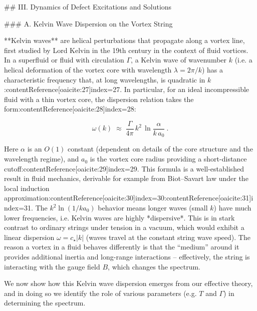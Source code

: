 \documentclass[12pt]{article}
\begin{document}
## III. Dynamics of Defect Excitations and Solutions

### A. Kelvin Wave Dispersion on the Vortex String 

**Kelvin waves** are helical perturbations that propagate along a vortex line, first studied by Lord Kelvin in the 19th century in the context of fluid vortices. In a superfluid or fluid with circulation $\Gamma$, a Kelvin wave of wavenumber $k$ (i.e. a helical deformation of the vortex core with wavelength $\lambda = 2\pi/k$) has a characteristic frequency that, at long wavelengths, is quadratic in $k$:contentReference[oaicite:27]{index=27}. In particular, for an ideal incompressible fluid with a thin vortex core, the dispersion relation takes the form:contentReference[oaicite:28]{index=28}:

\[ \omega(k) \;\approx\; \frac{\Gamma}{4\pi} \, k^2 \,\ln\!\frac{\alpha}{k\,a_0}~. \tag{8}\] 

Here $\alpha$ is an $O(1)$ constant (dependent on details of the core structure and the wavelength regime), and $a_0$ is the vortex core radius providing a short-distance cutoff:contentReference[oaicite:29]{index=29}. This formula is a well-established result in fluid mechanics, derivable for example from Biot–Savart law under the local induction approximation:contentReference[oaicite:30]{index=30}:contentReference[oaicite:31]{index=31}. The $k^2 \ln(1/k a_0)$ behavior means longer waves (small $k$) have much lower frequencies, i.e. Kelvin waves are highly *dispersive*. This is in stark contrast to ordinary strings under tension in a vacuum, which would exhibit a linear dispersion $\omega = c_\star |k|$ (waves travel at the constant string wave speed). The reason a vortex in a fluid behaves differently is that the “medium” around it provides additional inertia and long-range interactions – effectively, the string is interacting with the gauge field $B$, which changes the spectrum.

We now show how this Kelvin wave dispersion emerges from our effective theory, and in doing so we identify the role of various parameters (e.g. $T$ and $\Gamma$) in determining the spectrum. 
\end{document}
